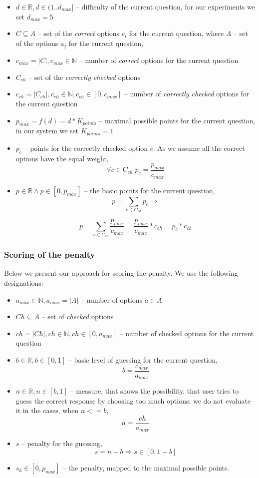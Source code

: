 \begin{itemize}
    \item $d \in \mathbb{R} , d \in (1..d_{max}]$ -- difficulty of the current question, for our experiments we set $d_{max} = 5$ 
    \item $C \subseteq A$ -- set of the \textit{correct} options $c_i$ for the current question, where $A$ -- set of the options $a_j$ for the current question,
    \item $c_{max} = |C| , c_{max} \in \mathbb{N}$ -- number of \textit{correct} options for the current question
    \item $C_{ch}$ -- set of the \textit{correctly checked} options
    \item $c_{ch} = |C_{ch}| , c_{ch} \in \mathbb{N} , c_{ch} \in [0,c_{max}]$ -- number of \textit{correctly checked} options for the current question
    \item $p_{max} = f(d) = d*K_{points}$ -- maximal possible points for the current question, in our system we set $K_{points} = 1$
    \item $p_c$ -- points for the correctly checked option $c$. 
    As we assume all the correct options have the equal weight, 
    \[\forall c \in C_{ch} \vert p_c = \frac{p_{max}}{c_{max}}\]
    \item $p \in \mathbb{R} \wedge p \in [0,p_{max}]$ -- the basic points for the current question,
    \[p = \sum_{c \in C_{ch}}{p_c} \Rightarrow \]

   \[p = \sum_{c \in C_{ch}}{\frac{p_{max}}{c_{max}}} = \frac{p_{max}}  {c_{max}}*c_{ch} = p_c*c_{ch}\]
\end{itemize}

\subsubsection{Scoring of the penalty}

Below we present our approach for scoring the penalty.
We use the following designations:

\begin{itemize}
    \item $a_{max} \in \mathbb{N} , a_{max} = |A|$ -- number of options $a \in A$
    \item $Ch \subseteq A$ -- set of \textit{checked} options
    \item $ch = |Ch| , ch \in \mathbb{N} , ch \in [0,a_{max}]$ -- number of checked options for the current question
    \item $b \in \mathbb{R} , b \in [0,1]$ -- basic level of guessing for the current question, 
    \[b = \frac{c_{max}}{a_{max}}\]
    \item $n \in \mathbb{R} , n \in [b,1]$ -- measure, that shows the possibility, that user tries to guess the correct response by choosing too much options; we do not evaluate it in the cases, when $n <= b$,
   \[n = \frac{ch}{a_{max}}\]
    \item $s$ -- penalty for the guessing,
    \[s = n-b \Rightarrow s \in [0,1-b]\]
    \item $s_k \in [0,p_{max}]$ -- the penalty, mapped to the maximal possible points.
\end{itemize}

